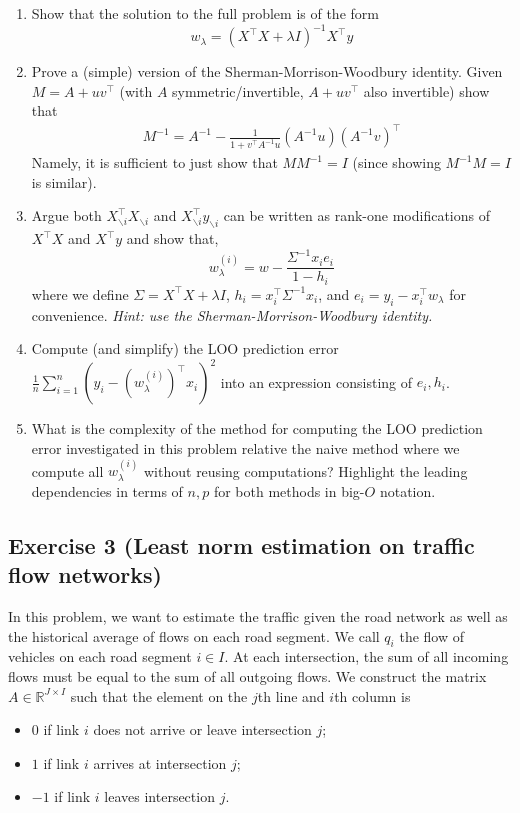 \documentclass[11pt]{article}
\begin{document}
\begin{enumerate}
    \item Show that the solution to the full problem is of the form
    \[
    w_\lambda = (X^\top X+\lambda I)^{-1}X^\top y
    \]
    \item Prove a (simple) version of the Sherman-Morrison-Woodbury identity. Given $M=A+uv^\top$ (with $A$ symmetric/invertible, $A+uv^\top$ also invertible) show that
    \begin{align}
        M^{-1} = A^{-1}-\frac{1}{1+v^\top A^{-1} u} (A^{-1} u)(A^{-1} v)^\top
    \end{align}
    Namely, it is sufficient to just show that $MM^{-1}=I$ (since showing $M^{-1}M=I$ is similar).
    \item Argue both $X_{\backslash i}^\top X_{\backslash i}$ and $X_{\backslash i}^\top y_{\backslash i}$ can be written as rank-one modifications of $X^\top X$ and $X^\top y$ and show that,
    \[
    w^{(i)}_\lambda = w - \frac{\Sigma^{-1} x_i e_i}{1-h_i}
    \]
    where we define $\Sigma = X^\top X+\lambda I$, $h_i = x_i^\top \Sigma^{-1} x_i$, and $e_i = y_i - x_i^\top w_{\lambda}$ for convenience.
    {\em Hint: use the Sherman-Morrison-Woodbury identity.}

    \item Compute (and simplify) the LOO prediction error $\frac{1}{n} \sum_{i=1}^{n} (y_i-(w^{(i)}_{\lambda})^\top x_i)^2$ into an expression consisting of $e_i, h_i$.

    \item What is the complexity of the method for computing the LOO prediction error investigated in this problem relative the naive method where we compute all $w_{\lambda}^{(i)}$ without reusing computations? Highlight the leading dependencies in terms of $n, p$ for both methods in big-$O$ notation.
\end{enumerate}

\begin{solution}
\end{solution}


\newpage
\subsection*{Exercise 3 (Least norm estimation on traffic flow networks)}

In this problem, we want to estimate the traffic given the road network as well as the historical average of flows on each road segment. We call $q_i$ the flow of vehicles on each road segment $i\in I$. At each intersection, the sum of all incoming flows must be equal to the sum of all outgoing flows. We construct the matrix $A \in \mathbb{R}^{J\times I}$ such that the element on the $j$th line and $i$th column is
\begin{itemize}
\item $0$ if link $i$ does not arrive or leave intersection $j$;
\item $1$ if link $i$ arrives at intersection $j$;
\item $-1$ if link $i$ leaves intersection $j$.
\end{itemize}
\end{document}
